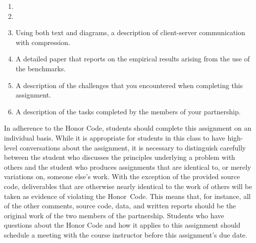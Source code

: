 \begin{enumerate}

    \item

    \item

    \item Using both text and diagrams, a description of client-server communication with compression.

    \item A detailed paper that reports on the empirical results arising from the use of the benchmarks.

    \item A description of the challenges that you encountered when completing this assignment.

    \item A description of the tasks completed by the members of your partnership.

\end{enumerate}

In adherence to the Honor Code, students should complete this assignment on an individual basis. While it is appropriate
for students in this class to have high-level conversations about the assignment, it is necessary to distinguish
carefully between the student who discusses the principles underlying a problem with others and the student who produces
assignments that are identical to, or merely variations on, someone else's work.  With the exception of the provided
source code, deliverables that are otherwise nearly identical to the work of others will be taken as evidence of
violating the \mbox{Honor Code}. This means that, for instance, all of the other comments, source code, data, and
written reports should be the original work of the two members of the partnership. Students who have questions about the
Honor Code and how it applies to this assignment should schedule a meeting with the course instructor before this
assignment's due date.


